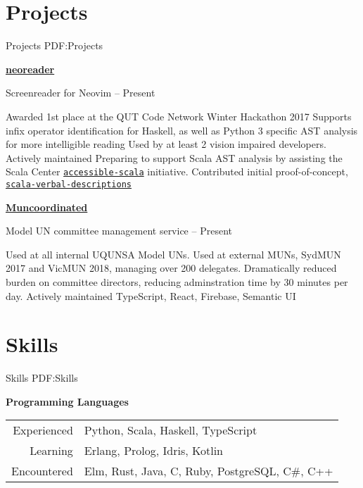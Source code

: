\documentclass[a4paper,10pt,oneside]{article}
\begin{document}
\begin{body}
\section
{Projects}
{Projects}
{PDF:Projects}

\href{https://github.com/MaxwellBo/neoreader}{\textbf{neoreader}} 
\par Screenreader for Neovim\hfill {} -- Present
\begin{detail}
	\BulletItem Awarded 1st place at the QUT Code Network Winter Hackathon 2017
	\BulletItem Supports infix operator identification for Haskell, as well as Python 3 specific AST analysis for more intelligible reading
	\BulletItem  Used by at least 2 vision impaired developers. Actively maintained
	\BulletItem Preparing to support Scala AST analysis by assisting the Scala Center \href{https://github.com/scalacenter/accessible-scala}{\texttt{accessible-scala}} initiative. Contributed initial proof-of-concept, \href{https://github.com/MaxwellBo/scala-verbal-descriptions}{\texttt{scala-verbal-descriptions}}
\end{detail}

\EntryGap

\href{https://github.com/MaxwellBo/Muncoordinated-2}{\textbf{Muncoordinated}}
\par Model UN committee management service\hfill {} -- Present
\begin{detail}
	\BulletItem Used at all internal UQUNSA Model UNs. Used at external MUNs, SydMUN 2017 and VicMUN 2018, managing over 200 delegates. Dramatically reduced burden on committee directors, reducing adminstration time by 30 minutes per day. Actively maintained
	\BulletItem TypeScript, React, Firebase, Semantic UI
\end{detail}


\section
{Skills}
{Skills}
{PDF:Skills}

\textbf{Programming Languages}
\par
\begin{tabular}{rl}
\par Experienced & Python, Scala, Haskell, TypeScript\\
\par Learning & Erlang, Prolog, Idris, Kotlin\\
\par Encountered & Elm, Rust, Java, C, Ruby, PostgreSQL, C\#, C++
\end{tabular}


\end{body}
\end{document}
